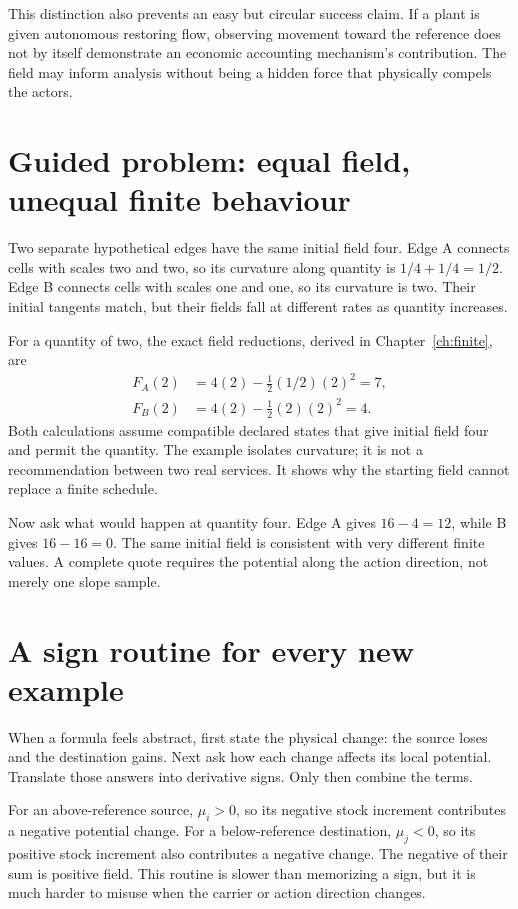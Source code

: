 This distinction also prevents an easy but circular success claim. If a plant is given autonomous restoring flow, observing movement toward the reference does not by itself demonstrate an economic accounting mechanism's contribution. The field may inform analysis without being a hidden force that physically compels the actors.

\section{Guided problem: equal field, unequal finite behaviour}
Two separate hypothetical edges have the same initial field four. Edge A connects cells with scales two and two, so its curvature along quantity is \(1/4+1/4=1/2\). Edge B connects cells with scales one and one, so its curvature is two. Their initial tangents match, but their fields fall at different rates as quantity increases.

For a quantity of two, the exact field reductions, derived in Chapter~\ref{ch:finite}, are
\begin{align}
 F_A(2)&=4(2)-\tfrac12(1/2)(2)^2=7,\\
 F_B(2)&=4(2)-\tfrac12(2)(2)^2=4.
\end{align}
Both calculations assume compatible declared states that give initial field four and permit the quantity. The example isolates curvature; it is not a recommendation between two real services. It shows why the starting field cannot replace a finite schedule.

Now ask what would happen at quantity four. Edge A gives \(16-4=12\), while B gives \(16-16=0\). The same initial field is consistent with very different finite values. A complete quote requires the potential along the action direction, not merely one slope sample.

\section{A sign routine for every new example}
When a formula feels abstract, first state the physical change: the source loses and the destination gains. Next ask how each change affects its local potential. Translate those answers into derivative signs. Only then combine the terms.

For an above-reference source, \(\mu_i>0\), so its negative stock increment contributes a negative potential change. For a below-reference destination, \(\mu_j<0\), so its positive stock increment also contributes a negative change. The negative of their sum is positive field. This routine is slower than memorizing a sign, but it is much harder to misuse when the carrier or action direction changes.

